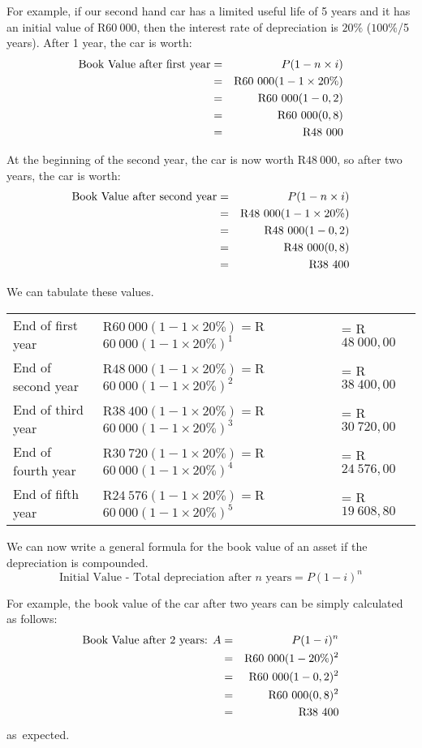 For example, if our second hand car has a limited useful life of 5 years and it has an initial value of R$60~000$, then the interest rate of depreciation is $20\%$ ($100\%$/5 years). After 1 year, the car is worth:
\begin{eqnarray*}
\mbox{Book Value after first year} &=& P(1-n\times i)\\
&=&\rm{R}60~000(1-1\times 20\%)\\
&=&\rm{R}60~000(1-0,2)\\
&=&\rm{R}60~000(0,8)\\
&=&\rm{R}48~000
\end{eqnarray*}

At the beginning of the second year, the car is now worth R$48~000$, so after two years, the car is worth:
\begin{eqnarray*}
\mbox{Book Value after second year} &=& P(1-n\times i)\\
&=&\rm{R}48~000(1-1\times 20\%)\\
&=&\rm{R}48~000(1-0,2)\\
&=&\rm{R}48~000(0,8)\\
&=&\rm{R}38~400
\end{eqnarray*}

We can tabulate these values.
\begin{center}
\begin{tabular}{lll}
End of first year&R$60~000(1-1\times20\%)=$R$60~000(1-1\times20\%)^1$ &= R$48~000,00$\\
End of second year&R$48~000(1-1\times20\%)=$R$60~000(1-1\times20\%)^2$&= R$38~400,00$\\
End of third year&R$38~400(1-1\times20\%)=$R$60~000(1-1\times20\%)^3$&= R$30~720,00$\\
End of fourth year&R$30~720(1-1\times20\%)=$R$60~000(1-1\times20\%)^4$&= R$24~576,00$\\
End of fifth year&R$24~576(1-1\times20\%)=$R$60~000(1-1\times20\%)^5$&= R$19~608,80$\\
\end{tabular}
\end{center}
We can now write a general formula for the book value of an asset if the depreciation is compounded.
\begin{equation}
\mbox{Initial Value - Total depreciation after $n$ years} = P(1-i)^n
\end{equation}

For example, the book value of the car after two years can be simply calculated as follows:
\begin{eqnarray*}
\mbox{Book Value after 2 years: } A &=& P(1-i)^n\\
&=&\rm{R}60~000(1-20\%)^2\\
&=&\rm{R}60~000(1-0,2)^2\\
&=&\rm{R}60~000(0,8)^2\\
&=&\rm{R}38~400
\end{eqnarray*}
\mbox{as expected.}

